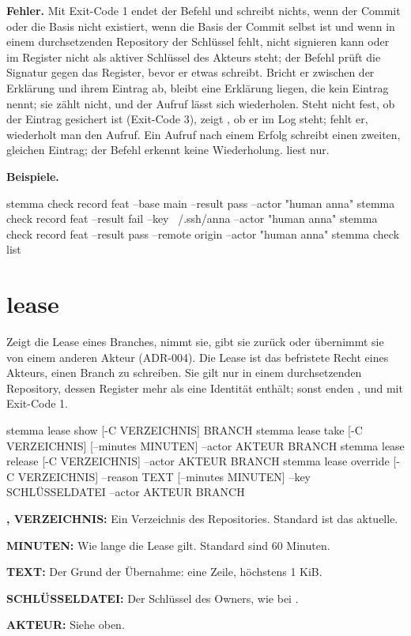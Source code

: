 {\bf Fehler.} Mit Exit-Code 1 endet der Befehl und schreibt nichts, wenn der Commit oder die
Basis nicht existiert, wenn die Basis der Commit selbst ist und wenn in einem durchsetzenden
Repository der Schlüssel fehlt, nicht signieren kann oder im Register nicht als aktiver Schlüssel
des Akteurs steht; der Befehl prüft die Signatur gegen das Register, bevor er etwas schreibt.
Bricht er zwischen der Erklärung und ihrem Eintrag ab, bleibt eine Erklärung liegen, die kein
Eintrag nennt; sie zählt nicht, und der Aufruf lässt sich wiederholen.
Steht nicht fest, ob der Eintrag gesichert ist (Exit-Code 3), zeigt , ob er
im Log steht; fehlt er, wiederholt man den Aufruf.
Ein Aufruf nach einem Erfolg schreibt einen zweiten, gleichen Eintrag; der Befehl erkennt keine
Wiederholung.  liest nur.

{\bf Beispiele.}

\starttyping
stemma check record feat --base main --result pass --actor "human anna"
stemma check record feat --result fail --key ~/.ssh/anna --actor "human anna"
stemma check record feat --result pass --remote origin --actor "human anna"
stemma check list
\stoptyping

\section{lease}

Zeigt die Lease eines Branches, nimmt sie, gibt sie zurück oder übernimmt sie von einem anderen
Akteur (ADR-004). Die Lease ist das befristete Recht eines Akteurs, einen Branch zu schreiben.
Sie gilt nur in einem durchsetzenden Repository, dessen Register mehr als eine Identität
enthält; sonst enden ,  und  mit Exit-Code 1.

\starttyping
stemma lease show [-C VERZEICHNIS] BRANCH
stemma lease take [-C VERZEICHNIS] [--minutes MINUTEN] --actor AKTEUR BRANCH
stemma lease release [-C VERZEICHNIS] --actor AKTEUR BRANCH
stemma lease override [-C VERZEICHNIS] --reason TEXT [--minutes MINUTEN] --key SCHLÜSSELDATEI
        --actor AKTEUR BRANCH
\stoptyping

\startitemize
\item {\bf {},  VERZEICHNIS:} Ein Verzeichnis des Repositories.
Standard ist das aktuelle.
\item {\bf {} MINUTEN:} Wie lange die Lease gilt. Standard sind 60 Minuten.
\item {\bf {} TEXT:} Der Grund der Übernahme: eine Zeile, höchstens 1 KiB.
\item {\bf {} SCHLÜSSELDATEI:} Der Schlüssel des Owners, wie bei .
\item {\bf {} AKTEUR:} Siehe oben.
\stopitemize

